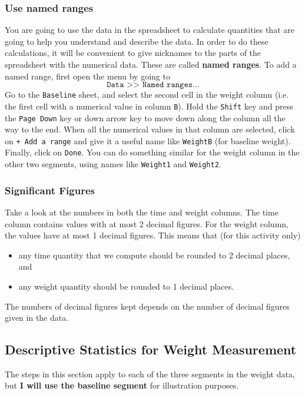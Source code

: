 \subsubsection{Use named ranges}
%
You are going to use the data in the spreadsheet to calculate quantities that are going to help you understand and describe the data. In order to do these calculations, it will be convenient to give nicknames to the parts of the spreadsheet with the numerical data. These are called \textbf{named ranges}. To add a named range, first open the menu by going to
\begin{equation}
    \texttt{Data >> Named ranges...}
\end{equation}
Go to the \texttt{Baseline} sheet, and select the second cell in the weight column (i.e. the first cell with a numerical value in column \texttt{B}). Hold the \texttt{Shift} key and press the \texttt{Page Down} key or down arrow key to move down along the column all the way to the end. When all the numerical values in that column are selected, click on \texttt{+ Add a range} and give it a useful name like \texttt{WeightB} (for baseline weight). Finally, click on \texttt{Done}. You can do something similar for the weight column in the other two segments, using names like \texttt{Weight1} and \texttt{Weight2}.
%
\subsubsection{Significant Figures}
%
Take a look at the numbers in both the time and weight columns. The time column contains values with at most 2 decimal figures. For the weight column, the values have at most 1 decimal figures. This means that (for this activity only)
\begin{itemize}
    \item any time quantity that we compute should be rounded to 2 decimal places, and
    \item any weight quantity should be rounded to 1 decimal places.
\end{itemize}
The numbers of decimal figures kept depends on the number of decimal figures given in the data.
%
\subsection{Descriptive Statistics for Weight Measurement}
%
The steps in this section apply to each of the three segments in the weight data, but \textbf{I will use the baseline segment} for illustration purposes.
%
